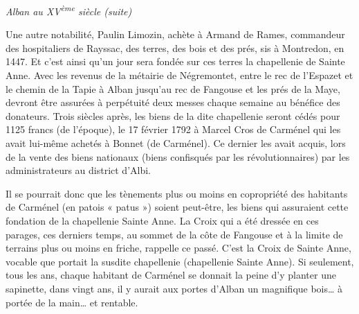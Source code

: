 
\begin{center}
    {\Large\itshape Alban au XV\textsuperscript{ème} siècle (suite)}
\end{center}

\vspace{1.5em}

Une autre notabilité, Paulin Limozin, achète à Armand de Rames,
commandeur des hospitaliers de Rayssac, des terres, des bois et des prés,
sis à Montredon, en 1447. Et c'est ainsi qu'un jour sera fondée sur ces
terres la chapellenie de Sainte Anne. Avec les revenus de la métairie de
Négremontet, entre le rec de l'Espazet et le chemin de la Tapie à Alban
jusqu'au rec de Fangouse et les prés de la Maye, devront être assurées à
perpétuité deux messes chaque semaine au bénéfice des donateurs. Trois
siècles après, les biens de la dite chapellenie seront cédés pour 1125
francs (de l'époque), le 17 février 1792 à Marcel Cros de Carménel qui les
avait lui-même achetés à Bonnet (de Carménel). Ce dernier les avait
acquis, lors de la vente des biens nationaux (biens confisqués par les
révolutionnaires) par les administrateurs au district d'Albi.

\medskip

Il se pourrait donc que les tènements plus ou moins en copropriété des
habitants de Carménel (en patois « patus ») soient peut-être, les biens
qui assuraient cette fondation de la chapellenie Sainte Anne. La Croix
qui a été dressée en ces parages, ces derniers temps, au sommet de la côte
de Fangouse et à la limite de terrains plus ou moins en friche, rappelle
ce passé. C'est la Croix de Sainte Anne, vocable que portait la susdite
chapellenie (chapellenie Sainte Anne). Si seulement, tous les ans, chaque
habitant de Carménel se donnait la peine d'y planter une sapinette, dans
vingt ans, il y aurait aux portes d'Alban un magnifique bois… à portée de
la main… et rentable.
